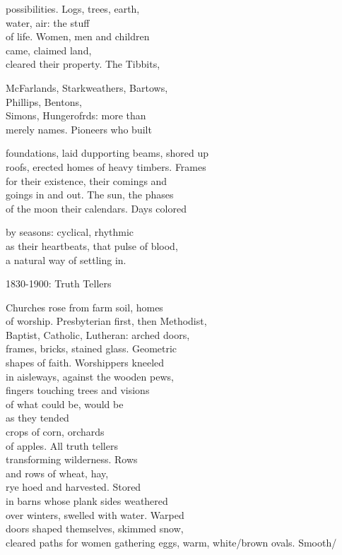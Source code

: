 \documentclass[twoside,10pt]{book}
\begin{document}
possibilities. Logs, trees, earth,\\
water, air: the stuff\\
of life. Women, men and children\\
came, claimed land,\\
cleared their property. The Tibbits,

McFarlands, Starkweathers, Bartows,\\
Phillips, Bentons,\\
Simons, Hungerofrds: more than\\
merely names. Pioneers who built

foundations, laid dupporting beams, shored up\\
roofs, erected homes of heavy timbers. Frames\\
for their existence, their comings and\\
goings in and out. The sun, the phases\\
of the moon their calendars. Days colored

by seasons: cyclical, rhythmic\\
as their heartbeats, that pulse of blood,\\
a natural way of settling in.

1830-1900: Truth Tellers

Churches rose from farm soil, homes\\
of worship. Presbyterian first, then Methodist,\\
Baptist, Catholic, Lutheran: arched doors,\\
frames, bricks, stained glass. Geometric\\
shapes of faith. Worshippers kneeled\\
in aisleways, against the wooden pews,\\
fingers touching trees and visions\\
of what could be, would be\\
as they tended\\
crops of corn, orchards\\
of apples. All truth tellers\\
transforming wilderness. Rows\\
and rows of wheat, hay,\\
rye hoed and harvested. Stored\\
in barns whose plank sides weathered\\
over winters, swelled with water. Warped\\
doors shaped themselves, skimmed snow,\\
cleared paths for women gathering eggs, warm, white/brown ovals. Smooth/
\end{document}
